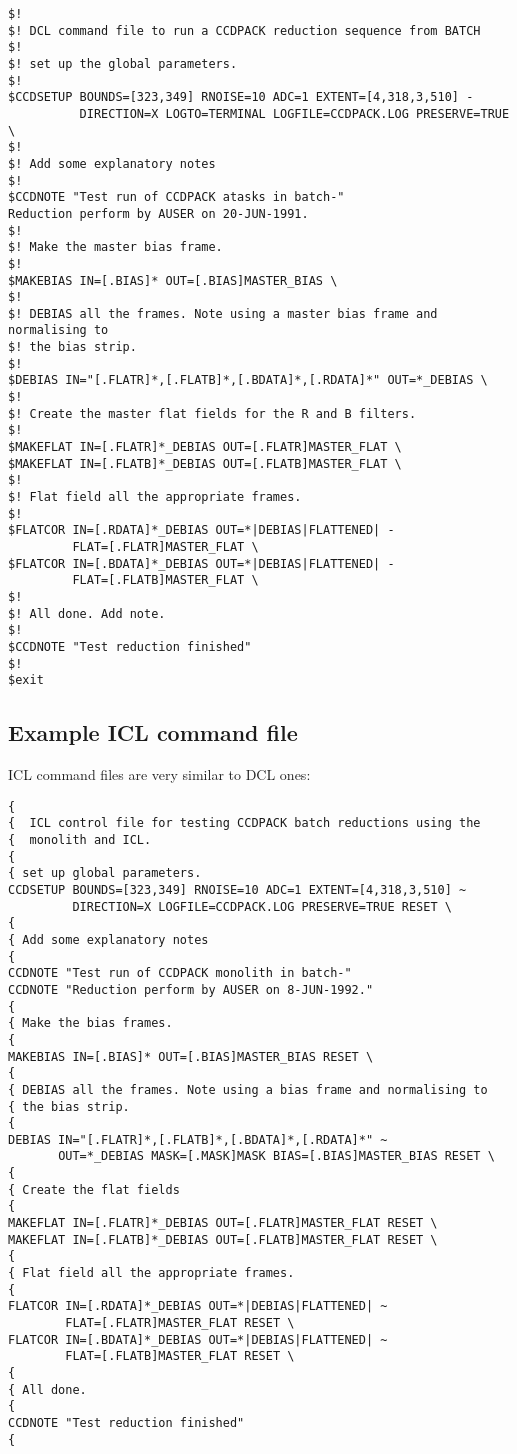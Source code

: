 \begin{myquote}
\begin{verbatim}
$!
$! DCL command file to run a CCDPACK reduction sequence from BATCH
$!
$! set up the global parameters.
$!
$CCDSETUP BOUNDS=[323,349] RNOISE=10 ADC=1 EXTENT=[4,318,3,510] -
          DIRECTION=X LOGTO=TERMINAL LOGFILE=CCDPACK.LOG PRESERVE=TRUE \
$!
$! Add some explanatory notes
$!
$CCDNOTE "Test run of CCDPACK atasks in batch-"
Reduction perform by AUSER on 20-JUN-1991.
$!
$! Make the master bias frame.
$!
$MAKEBIAS IN=[.BIAS]* OUT=[.BIAS]MASTER_BIAS \
$!
$! DEBIAS all the frames. Note using a master bias frame and normalising to
$! the bias strip.
$!
$DEBIAS IN="[.FLATR]*,[.FLATB]*,[.BDATA]*,[.RDATA]*" OUT=*_DEBIAS \
$!
$! Create the master flat fields for the R and B filters.
$!
$MAKEFLAT IN=[.FLATR]*_DEBIAS OUT=[.FLATR]MASTER_FLAT \
$MAKEFLAT IN=[.FLATB]*_DEBIAS OUT=[.FLATB]MASTER_FLAT \
$!
$! Flat field all the appropriate frames.
$!
$FLATCOR IN=[.RDATA]*_DEBIAS OUT=*|DEBIAS|FLATTENED| -
         FLAT=[.FLATR]MASTER_FLAT \
$FLATCOR IN=[.BDATA]*_DEBIAS OUT=*|DEBIAS|FLATTENED| -
         FLAT=[.FLATB]MASTER_FLAT \
$!
$! All done. Add note.
$!
$CCDNOTE "Test reduction finished"
$!
$exit
\end{verbatim}
\end{myquote}

\subsection{Example ICL command file}

ICL command files are very similar to DCL ones:

\begin{myquote}
\begin{verbatim}
{
{  ICL control file for testing CCDPACK batch reductions using the
{  monolith and ICL.
{
{ set up global parameters.
CCDSETUP BOUNDS=[323,349] RNOISE=10 ADC=1 EXTENT=[4,318,3,510] ~
         DIRECTION=X LOGFILE=CCDPACK.LOG PRESERVE=TRUE RESET \
{
{ Add some explanatory notes
{
CCDNOTE "Test run of CCDPACK monolith in batch-"
CCDNOTE "Reduction perform by AUSER on 8-JUN-1992."
{
{ Make the bias frames.
{
MAKEBIAS IN=[.BIAS]* OUT=[.BIAS]MASTER_BIAS RESET \
{
{ DEBIAS all the frames. Note using a bias frame and normalising to
{ the bias strip.
{
DEBIAS IN="[.FLATR]*,[.FLATB]*,[.BDATA]*,[.RDATA]*" ~
       OUT=*_DEBIAS MASK=[.MASK]MASK BIAS=[.BIAS]MASTER_BIAS RESET \
{
{ Create the flat fields
{
MAKEFLAT IN=[.FLATR]*_DEBIAS OUT=[.FLATR]MASTER_FLAT RESET \
MAKEFLAT IN=[.FLATB]*_DEBIAS OUT=[.FLATB]MASTER_FLAT RESET \
{
{ Flat field all the appropriate frames.
{
FLATCOR IN=[.RDATA]*_DEBIAS OUT=*|DEBIAS|FLATTENED| ~
        FLAT=[.FLATR]MASTER_FLAT RESET \
FLATCOR IN=[.BDATA]*_DEBIAS OUT=*|DEBIAS|FLATTENED| ~
        FLAT=[.FLATB]MASTER_FLAT RESET \
{
{ All done.
{
CCDNOTE "Test reduction finished"
{
\end{verbatim}
\end{myquote}


